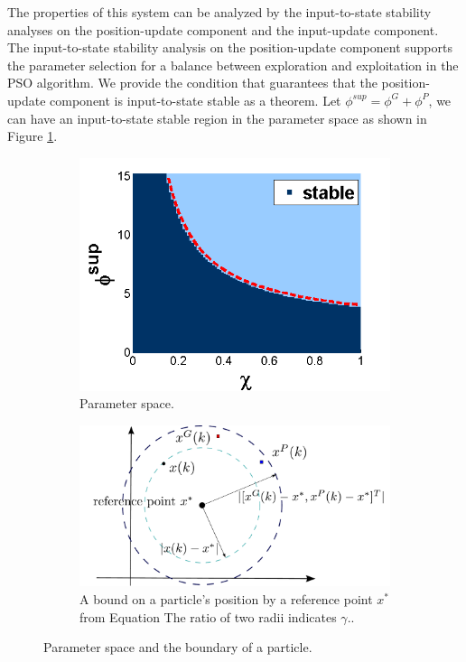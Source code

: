 \documentclass[phd]{byuprop}
\begin{document}
\begin{appendices}
The properties of this system can be analyzed by the input-to-state stability analyses on the position-update component and the input-update component. 
The input-to-state stability analysis on the position-update component supports the parameter selection for a balance between exploration and exploitation in the PSO algorithm.
We provide the condition that guarantees that the position-update component is input-to-state stable as a theorem.
Let $ \phi^{sup}  = \phi^{G} + \phi^{P} $, we can have an input-to-state stable region in the parameter space as shown in Figure \ref{fig:paramSpace}.

\begin{figure}[htbp]
	\centering
	\begin{subfigure}[t]{0.4\linewidth}
		\centering
		\includegraphics[width=\textwidth]{./fig/param2.png}
		\caption{Parameter space.}
		\label{fig:paramSpace}
	\end{subfigure}  
	\begin{subfigure}[t]{0.55\linewidth}
		\centering
		\includegraphics[width=\textwidth]{./fig/boundary}
		\caption{A bound on a particle's position by a reference point $ x^{*} $ from Equation %
		The ratio of two radii indicates $ \gamma $..}
		\label{fig:boundary}
	\end{subfigure}   
	\caption{Parameter space and the boundary of a particle.}
	\label{fig:particle:param_bound}
\end{figure}


\end{appendices}
\end{document}
